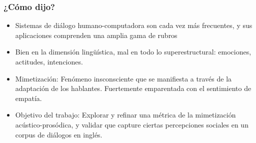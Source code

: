 \begin{frame}
  \frametitle{¿Cómo dijo?}


\begin{itemize}[<+->]
  \item Sistemas de diálogo humano-computadora son cada vez más frecuentes, y sus aplicaciones comprenden una amplia gama de rubros
  \item Bien en la dimensión lingüística, mal en todo lo superestructural: emociones, actitudes, intenciones.
  \item Mimetización: Fenómeno insconsciente que se manifiesta a través de la adaptación de los hablantes. Fuertemente emparentada con el sentimiento de empatía.
  \item Objetivo del trabajo: Explorar y refinar una métrica de la mimetización acústico-prosódica, y validar que capture ciertas percepciones sociales en un corpus de diálogos en inglés.
\end{itemize}

\end{frame}

